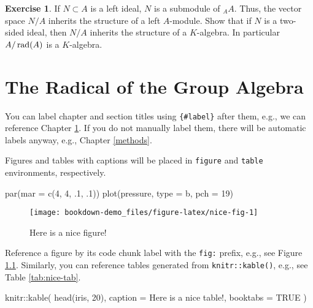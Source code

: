 \documentclass[
]{book}
\newenvironment{Shaded}{\begin{snugshade}}{\end{snugshade}}
\newcommand{\AttributeTok}[1]{\textcolor[rgb]{0.77,0.63,0.00}{#1}}
\newcommand{\ConstantTok}[1]{\textcolor[rgb]{0.00,0.00,0.00}{#1}}
\newcommand{\DecValTok}[1]{\textcolor[rgb]{0.00,0.00,0.81}{#1}}
\newcommand{\FunctionTok}[1]{\textcolor[rgb]{0.00,0.00,0.00}{#1}}
\newcommand{\NormalTok}[1]{#1}
\newcommand{\SpecialCharTok}[1]{\textcolor[rgb]{0.00,0.00,0.00}{#1}}
\newcommand{\StringTok}[1]{\textcolor[rgb]{0.31,0.60,0.02}{#1}}
\theoremstyle{definition}
\theoremstyle{definition}
\theoremstyle{definition}
\newtheorem{exercise}{Exercise}[chapter]
\theoremstyle{definition}
\theoremstyle{remark}
\begin{document}
\begin{exercise}
If \(N\subset A\) is a left ideal, \(N\) is a submodule of \({}_AA\).
Thus, the vector space \(N/A\) inherits the structure of a left \(A\)-module.
Show that if \(N\) is a two-sided ideal, then \(N/A\) inherits the structure of a \(K\)-algebra.
In particular \(A/\operatorname*{rad}(A)\) is a \(K\)-algebra.
\end{exercise}

\hypertarget{intro}{%
\chapter{The Radical of the Group Algebra}\label{intro}}

You can label chapter and section titles using \texttt{\{\#label\}} after them, e.g., we can reference Chapter \ref{intro}. If you do not manually label them, there will be automatic labels anyway, e.g., Chapter \ref{methods}.

Figures and tables with captions will be placed in \texttt{figure} and \texttt{table} environments, respectively.

\begin{Shaded}
\begin{Highlighting}[]
\FunctionTok{par}\NormalTok{(}\AttributeTok{mar =} \FunctionTok{c}\NormalTok{(}\DecValTok{4}\NormalTok{, }\DecValTok{4}\NormalTok{, .}\DecValTok{1}\NormalTok{, .}\DecValTok{1}\NormalTok{))}
\FunctionTok{plot}\NormalTok{(pressure, }\AttributeTok{type =} \StringTok{\textquotesingle{}b\textquotesingle{}}\NormalTok{, }\AttributeTok{pch =} \DecValTok{19}\NormalTok{)}
\end{Highlighting}
\end{Shaded}

\begin{figure}

{\centering \texttt{[image: bookdown-demo\_files/figure-latex/nice-fig-1]} 

}

\caption{Here is a nice figure!}\label{fig:nice-fig}
\end{figure}

Reference a figure by its code chunk label with the \texttt{fig:} prefix, e.g., see Figure \ref{fig:nice-fig}. Similarly, you can reference tables generated from \texttt{knitr::kable()}, e.g., see Table \ref{tab:nice-tab}.

\begin{Shaded}
\begin{Highlighting}[]
\NormalTok{knitr}\SpecialCharTok{::}\FunctionTok{kable}\NormalTok{(}
  \FunctionTok{head}\NormalTok{(iris, }\DecValTok{20}\NormalTok{), }\AttributeTok{caption =} \StringTok{\textquotesingle{}Here is a nice table!\textquotesingle{}}\NormalTok{,}
  \AttributeTok{booktabs =} \ConstantTok{TRUE}
\NormalTok{)}
\end{Highlighting}
\end{Shaded}
\end{document}
